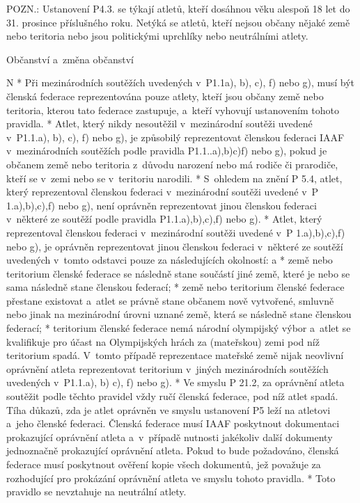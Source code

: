 POZN.: Ustanovení P4.3. se týkají atletů, kteří dosáhnou věku alespoň 18 let do 31. prosince příslušného roku.
Netýká se atletů, kteří nejsou občany nějaké země nebo teritoria nebo jsou politickými uprchlíky nebo neutrálními atlety.

\secc Občanství a~změna občanství

\begitems \style N
* Při mezinárodních soutěžích uvedených v~P1.1a), b), c), f) nebo g), musí být členská federace reprezentována pouze atlety, kteří jsou občany země nebo teritoria, kterou tato federace zastupuje, a~kteří vyhovují ustanovením tohoto pravidla.
* Atlet, který nikdy nesoutěžil v~mezinárodní soutěži uvedené v~P1.1.a), b), c), f) nebo g), je způsobilý reprezentovat členskou federaci IAAF v~mezinárodních soutěžích podle pravidla P1.1..a),b)c)f) nebo g), pokud je občanem země nebo teritoria z~důvodu narození nebo má rodiče či prarodiče, kteří se v~zemi nebo se v~teritoriu narodili.
* S~ohledem na znění P 5.4, atlet, který reprezentoval členskou federaci v~mezinárodní soutěži uvedené v~P 1.a),b),c),f) nebo g), není oprávněn reprezentovat jinou členskou federaci v~některé ze soutěží podle pravidla P1.1.a),b),c),f) nebo g).
* Atlet, který reprezentoval členskou federaci v~mezinárodní soutěži uvedené v~P 1.a),b),c),f) nebo g), je oprávněn reprezentovat jinou členskou federaci v~některé ze soutěží uvedených v~tomto odstavci pouze za následujících okolností:
  \begitems \style a
  * země nebo teritorium členské federace se následně stane součástí jiné země, které je nebo se sama následně stane členskou federací;
  * země nebo teritorium členské federace přestane existovat a~atlet se právně stane občanem nově vytvořené, smluvně nebo jinak na mezinárodní úrovni uznané země, která se následně stane členskou federací;
  * teritorium členské federace nemá národní olympijský výbor a~atlet se kvalifikuje pro účast na Olympijských hrách za (mateřskou) zemi pod níž teritorium spadá. V~tomto případě reprezentace mateřské země nijak neovlivní oprávnění atleta reprezentovat teritorium v~jiných mezinárodních soutěžích uvedených v~P1.1.a), b) c), f) nebo g).
  \enditems
* Ve smyslu P 21.2, za oprávnění atleta soutěžit podle těchto pravidel vždy ručí členská federace, pod níž atlet spadá. Tíha důkazů, zda je atlet oprávněn ve smyslu ustanovení P5 leží na atletovi a~jeho členské federaci. Členská federace musí IAAF poskytnout dokumentaci prokazující oprávnění atleta a~v~případě nutnosti jakékoliv další dokumenty jednoznačně prokazující oprávnění atleta. Pokud to bude požadováno, členská federace musí poskytnout ověření kopie všech dokumentů, jež považuje za rozhodující pro prokázání oprávnění atleta ve smyslu tohoto pravidla.
* Toto pravidlo se nevztahuje na neutrální atlety.
\enditems

